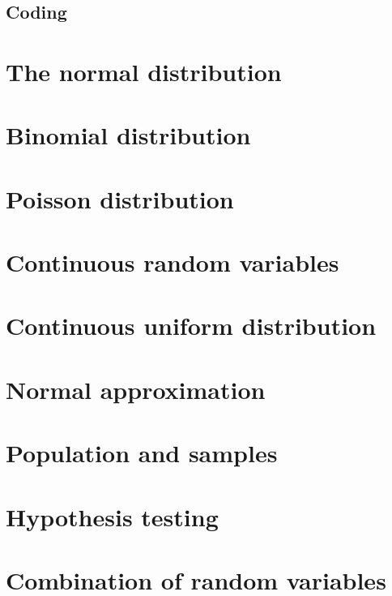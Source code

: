 \documentclass[a4paper]{article}
\begin{document}
\begin{defi}[Variable]

\end{defi}
\begin{defi}

\end{defi}

\subsection{Coding}

\section{The normal distribution}

\section{Binomial distribution}

\section{Poisson distribution}

\section{Continuous random variables}

\section{Continuous uniform distribution}

\section{Normal approximation}

\section{Population and samples}

\section{Hypothesis testing}

\section{Combination of random variables}
\end{document}
